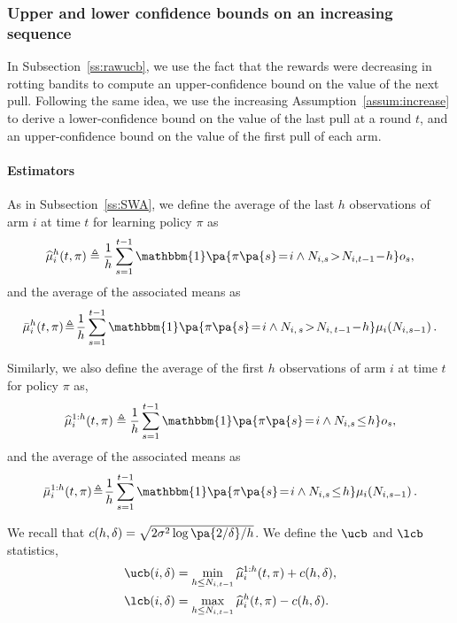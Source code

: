 \subsubsection{Upper and lower confidence bounds on an increasing sequence }
In Subsection~\ref{ss:rawucb}, we use the fact that the rewards were decreasing in rotting bandits to compute an upper-confidence bound on the value of the next pull. Following the same idea, we use the increasing Assumption~\ref{assum:increase} to derive a lower-confidence bound on the value of the last pull at a round $t$, and an upper-confidence bound on the value of the first pull of each arm.
\paragraph{Estimators}
As in Subsection~\ref{ss:SWA}, we define the average of the last $h$ observations of arm $i$ at time $t$ for learning policy $\pi$ as
\begin{equation*}
\widehat{\mu}_i^h(t,\pi) \triangleq \frac{1}{h}\sum_{s=1}^{t-1} \mathbbm{1}\pa{\pi\pa{s}\! =\! i \land N_{i,s}\!>\! N_{i,t-1}\! -\! h } o_{s},
\end{equation*}
and the average of the associated means as
\begin{equation*}
\bar{\mu}_i^h(t,\pi) \!\triangleq\! \frac{1}{h}\sum_{s=1}^{t-1} \mathbbm{1}\pa{\pi\pa{s}\! =\! i \land N_{i,\,s}\!>\! N_{i,\,t-1}\! -\! h } \mu_{i}(N_{i,s-1})\,.
\end{equation*}
 
Similarly, we also define the average of the first $h$ observations of arm $i$ at time $t$ for policy $\pi$ as,
\begin{equation*}
\widehat{\mu}_i^{1:h}(t,\pi) \triangleq \frac{1}{h}\sum_{s=1}^{t-1} \mathbbm{1}\pa{\pi\pa{s}\! =\! i \land N_{i,s} \!\leq\! h } o_{s},
\end{equation*}
and the average of the associated means as
\begin{equation*}
\bar{\mu}_i^{1:h}(t,\pi) \!\triangleq\! \frac{1}{h}\sum_{s=1}^{t-1} \mathbbm{1}\pa{\pi\pa{s}\! =\! i \land N_{i,s} \!\leq\! h} \mu_{i}(N_{i,s-1})\,.
\end{equation*}


We recall that $c(h,\delta) = \sqrt{2\sigma^2\log\pa{2/\delta}/h}$. We define the $\ucb$ and $\lcb$ statistics,
\begin{align}
&\ucb(i,\delta) = \min_{h\leq N_{i,t-1}} \widehat{\mu}_i^{1:h}(t,\pi) +c (h, \delta),\nonumber\\
&\lcb(i,\delta) = \max_{h\leq N_{i,t-1}} \widehat{\mu}_i^{h}(t,\pi) - c (h, \delta).\label{eq:lcbucb}
\end{align}

